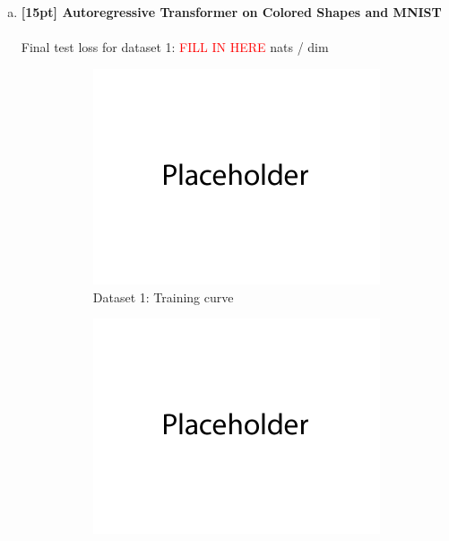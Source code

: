 \documentclass{article}
\begin{document}
\begin{enumerate}[(a)]
\newpage

\item {\bf [15pt] Autoregressive Transformer on Colored Shapes and MNIST} \\\\
Final test loss for dataset 1: \textcolor{red}{FILL IN HERE}  nats / dim
\begin{figure}[H]
    \centering
    \begin{subfigure}{0.45\textwidth}
        \centering
        \includegraphics[width=\textwidth]{figures/placeholder.png}
        \caption{Dataset 1: Training curve}
    \end{subfigure}
    \hspace{0.2in}
    \begin{subfigure}{0.45\textwidth}
        \centering
        \includegraphics[width=\textwidth]{figures/placeholder.png}

\end{subfigure}
\end{figure}
\end{enumerate}
\end{document}

